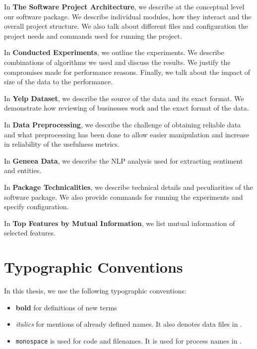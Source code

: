 In \textbf{ The Software Project Architecture}, we describe at the conceptual level our software package.
We describe individual modules, how they interact and the overall project structure.
We also talk about different files and configuration the project needs and commands used for running the project.

In \textbf{ Conducted Experiments}, we outline the experiments.
We describe combinations of algorithms we used and discuss the results.
We justify the compromises made for performance reasons.
Finally, we talk about the impact of size of the data to the performance.

In \textbf{ Yelp Dataset},
we describe the source of the data and its exact format.
We demonstrate how reviewing of businesses work and
the exact format of the data.

In \textbf{ Data Preprocessing},
we describe the challenge of obtaining reliable data and
what preprocessing has been done to allow easier manipulation and increase in reliability of the usefulness metrics.

In \textbf{ Geneea Data},
we describe the NLP analysis used for extracting sentiment and entities.

In \textbf{ Package Technicalities},
we describe technical details and peculiarities of the software package.
We also provide commands for running the experiments and specify configuration.

In \textbf{ Top Features by Mutual Information},
we list mutual information of selected features.


\section{Typographic Conventions}

In this thesis, we use the following typographic conventions:

\begin{itemize}
\item \textbf{bold} for definitions of new terms

\item \textit{italics} for mentions of already defined names. It also denotes data files in .

\item \texttt{monospace} is used for code and filenames. It is used for process names in .

\end{itemize}


